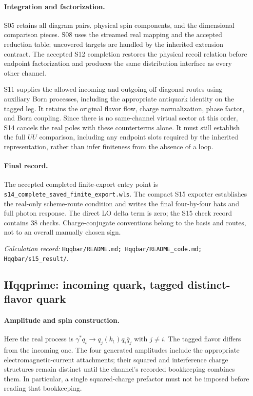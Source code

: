 \documentclass[11pt,a4paper]{article}
\newcommand{\code}[1]{{\small\nolinkurl{#1}}}
\newcommand{\pathref}[1]{\par{\footnotesize\textit{Calculation record:} \code{#1}.}\par}
\begin{document}
\paragraph{Integration and factorization.}
S05 retains all diagram pairs, physical spin components, and the dimensional comparison pieces. S08 uses the streamed real mapping and the accepted reduction table; uncovered targets are handled by the inherited extension contract. The accepted S12 completion restores the physical recoil relation before endpoint factorization and produces the same distribution interface as every other channel.

S11 supplies the allowed incoming and outgoing off-diagonal routes using auxiliary Born processes, including the appropriate antiquark identity on the tagged leg. It retains the original flavor flow, charge normalization, phase factor, and Born coupling. Since there is no same-channel virtual sector at this order, S14 cancels the real poles with these counterterms alone. It must still establish the full $UU$ comparison, including any endpoint slots required by the inherited representation, rather than infer finiteness from the absence of a loop.

\paragraph{Final record.}
The accepted completed finite-export entry point is \code{s14_complete_saved_finite_export.wls}. The compact S15 exporter establishes the real-only scheme-route condition and writes the final four-by-four hats and full photon response. The direct LO delta term is zero; the S15 check record contains 38 checks. Charge-conjugate conventions belong to the basis and routes, not to an overall manually chosen sign.
\pathref{Hqqbar/README.md; Hqqbar/README_code.md; Hqqbar/s15_result/}

\subsection{Hqqprime: incoming quark, tagged distinct-flavor quark}
\paragraph{Amplitude and spin construction.}
Here the real process is $\gamma^*q_i\to q_j(k_1)q_i\bar q_j$ with $j\ne i$. The tagged flavor differs from the incoming one. The four generated amplitudes include the appropriate electromagnetic-current attachments; their squared and interference charge structures remain distinct until the channel's recorded bookkeeping combines them. In particular, a single squared-charge prefactor must not be imposed before reading that bookkeeping.
\end{document}
